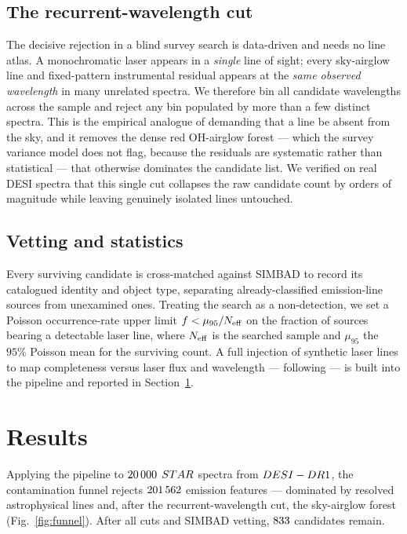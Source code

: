 \documentclass[11pt]{article}
\begin{document}
\subsection{The recurrent-wavelength cut}
\label{sec:recurrent}
The decisive rejection in a blind survey search is data-driven and needs no line
atlas. A monochromatic laser appears in a \emph{single} line of sight; every
sky-airglow line and fixed-pattern instrumental residual appears at the \emph{same
observed wavelength} in many unrelated spectra. We therefore bin all candidate
wavelengths across the sample and reject any bin populated by more than a few
distinct spectra. This is the empirical analogue of demanding that a line be
absent from the sky, and it removes the dense red OH-airglow forest --- which the
survey variance model does not flag, because the residuals are systematic rather
than statistical --- that otherwise dominates the candidate list. We verified on
real DESI spectra that this single cut collapses the raw candidate count by orders
of magnitude while leaving genuinely isolated lines untouched.

\subsection{Vetting and statistics}
Every surviving candidate is cross-matched against SIMBAD to record its catalogued
identity and object type, separating already-classified emission-line sources from
unexamined ones. Treating the search as a non-detection, we set a Poisson
occurrence-rate upper limit $f < \mu_{95}/N_{\rm eff}$ on the fraction of sources
bearing a detectable laser line, where $N_{\rm eff}$ is the searched sample and
$\mu_{95}$ the $95\%$ Poisson mean for the surviving count. A full injection of
synthetic laser lines to map completeness versus laser flux and wavelength ---
following \citet{Tellis2017} --- is built into the pipeline and reported in
Section~\ref{sec:results}.

\section{Results}
\label{sec:results}
Applying the pipeline to $20\,000$ $STAR$ spectra from
$DESI-DR1$, the contamination funnel rejects $201\,562$ emission
features --- dominated by resolved astrophysical lines and, after the
recurrent-wavelength cut, the sky-airglow forest (Fig.~\ref{fig:funnel}). After
all cuts and SIMBAD vetting, $833$ candidates remain. \LaserResultProse
\end{document}
